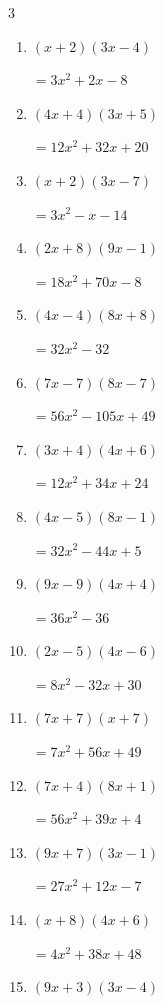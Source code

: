 \begin{multicols}{3}
\begin{enumerate}
        $=24x^{2}+46x+7$

\columnbreak %

  \item $(x+2)(3x-4)$

        $=3x^{2}+2x-8$

  \item $(4x+4)(3x+5)$

        $=12x^{2}+32x+20$

  \item $(x+2)(3x-7)$

        $=3x^{2}-x-14$

  \item $(2x+8)(9x-1)$

        $=18x^{2}+70x-8$

  \item $(4x-4)(8x+8)$

        $=32x^{2}-32$

  \item $(7x-7)(8x-7)$

        $=56x^{2}-105x+49$

  \item $(3x+4)(4x+6)$

        $=12x^{2}+34x+24$

  \item $(4x-5)(8x-1)$

        $=32x^{2}-44x+5$

  \item $(9x-9)(4x+4)$

        $=36x^{2}-36$

  \item $(2x-5)(4x-6)$

        $=8x^{2}-32x+30$

  \item $(7x+7)(x+7)$

        $=7x^{2}+56x+49$

  \item $(7x+4)(8x+1)$

        $=56x^{2}+39x+4$

  \item $(9x+7)(3x-1)$

        $=27x^{2}+12x-7$

  \item $(x+8)(4x+6)$

        $=4x^{2}+38x+48$

  \item $(9x+3)(3x-4)$


\end{enumerate}
\end{multicols}
